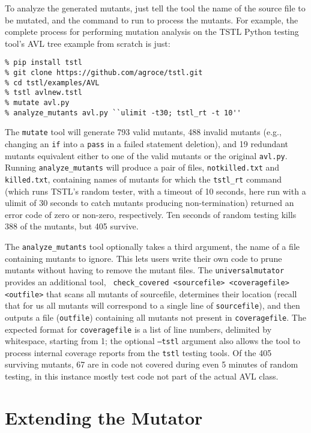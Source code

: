 To analyze the generated mutants, just tell the tool the name of the
source file to be mutated, and the command to run to process the
mutants.  For example, the complete process for performing mutation
analysis on the TSTL \cite{tstlsttt,nfm15} Python testing tool's AVL tree example from scratch is just:


\begin{verbatim}
% pip install tstl
% git clone https://github.com/agroce/tstl.git
% cd tstl/examples/AVL
% tstl avlnew.tstl
% mutate avl.py
% analyze_mutants avl.py ``ulimit -t30; tstl_rt -t 10''
\end{verbatim}

The {\tt mutate} tool will generate 793 valid mutants, 488 invalid
mutants (e.g., changing an {\tt if} into a {\tt pass} in a failed
statement deletion), and 19 redundant mutants equivalent either to one
of the valid mutants or the original {\tt avl.py}.
Running {\tt analyze\_mutants} will produce a pair of files, {\tt notkilled.txt} and {\tt
  killed.txt}, containing names of mutants for which the {\tt tstl\_rt}
command (which runs TSTL's random tester, with a timeout of 10
seconds, here run with a ulimit of 30 seconds to catch mutants
producing non-termination)
returned an error code of zero or non-zero, respectively.  Ten seconds
of random testing kills 388 of the mutants, but 405 survive.

The {\tt analyze\_mutants} tool optionally takes a third argument, the
name of a file containing mutants to ignore.  This lets users write
their own code to prune mutants without having to remove the mutant
files.  The {\tt universalmutator} provides an additional tool, {\tt
  check\_covered <sourcefile> <coveragefile> <outfile>} that scans all
mutants of sourcefile, determines their location (recall that for us all mutants will correspond to a single line
of {\tt sourcefile}), and then outputs a file ({\tt outfile})
containing all mutants not present in {\tt coveragefile}.  The
expected format for {\tt coveragefile} is a list of line numbers,
delimited by whitespace, starting from 1; the optional {\tt --tstl}
argument also allows the tool to process internal coverage reports
from the {\tt tstl} testing tools.  Of the 405 surviving mutants, 67
are in code not covered during even 5 minutes of random testing, in
this instance mostly test code not part of the actual AVL class.

\section{Extending the Mutator}

